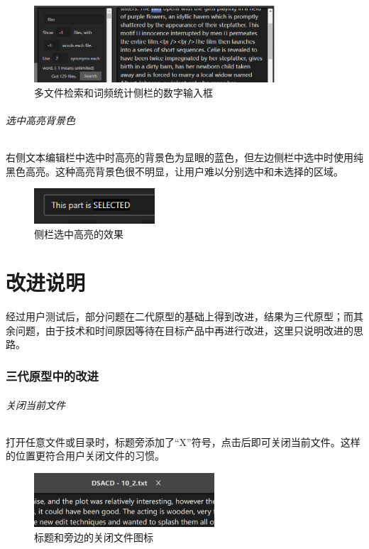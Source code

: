 \documentclass[scheme = chinese]{ctexart}
\begin{document}
\begin{figure}[h]
    \centering
    \includegraphics[width=0.8\textwidth]{images/问题-跳转不调整位置.png}
    \caption{多文件检索和词频统计侧栏的数字输入框}
\end{figure}

\paragraph{选中高亮背景色}
右侧文本编辑栏中选中时高亮的背景色为显眼的蓝色，但左边侧栏中选中时使用纯黑色高亮。这种高亮背景色很不明显，让用户难以分别选中和未选择的区域。

\begin{figure}[h]
    \centering
    \includegraphics[width=0.4\textwidth]{images/问题-选中高亮背景色.png}
    \caption{侧栏选中高亮的效果}
\end{figure}

\clearpage

\part{改进说明}

经过用户测试后，部分问题在二代原型的基础上得到改进，结果为三代原型；而其余问题，由于技术和时间原因等待在目标产品中再进行改进，这里只说明改进的思路。

\section{三代原型中的改进}
\paragraph{关闭当前文件}
打开任意文件或目录时，标题旁添加了“X”符号，点击后即可关闭当前文件。这样的位置更符合用户关闭文件的习惯。

\begin{figure}[h]
    \centering
    \includegraphics[width=0.6\textwidth]{images/改进-关闭文件.png}
    \caption{标题和旁边的关闭文件图标}
\end{figure}
\end{document}
